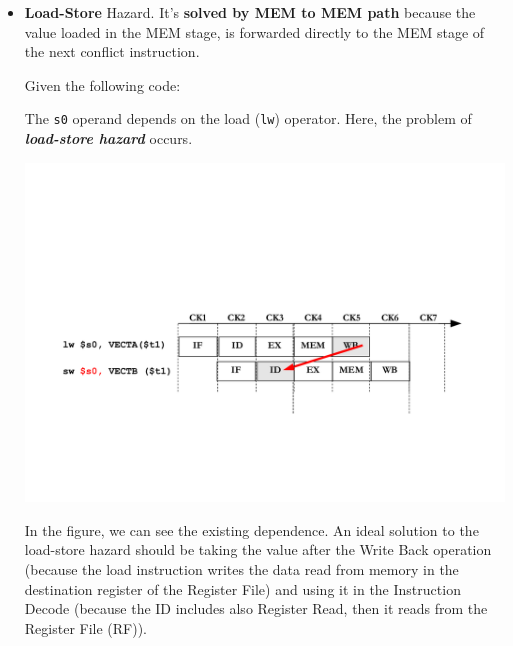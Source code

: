 \begin{itemize}
    \item \textbf{Load-Store} Hazard. It's \textbf{solved by MEM to MEM path} because the value loaded in the MEM stage, is forwarded directly to the MEM stage of the next conflict instruction.
    \begin{examplebox}
        Given the following code:
        
        The \texttt{s0} operand depends on the load (\texttt{lw}) operator. Here, the problem of \textbf{\emph{load-store hazard}} occurs.
        \begin{center}
            \includegraphics[width=\textwidth]{img/load-store-hazard-problem-1.pdf}
        \end{center}
        In the figure, we can see the existing dependence. An ideal solution to the load-store hazard should be taking the value after the Write Back operation (because the load instruction writes the data read from memory in the destination register of the Register File) and using it in the Instruction Decode (because the ID includes also Register Read, then it reads from the Register File (RF)).


\end{examplebox}
\end{itemize}
